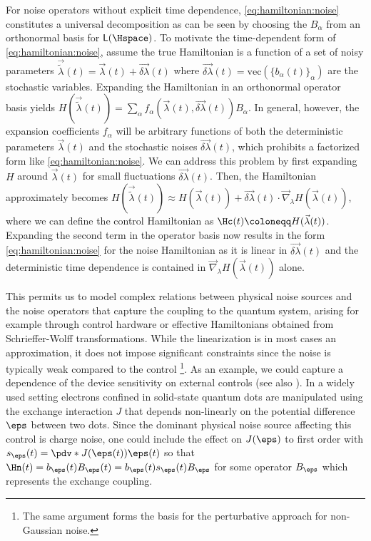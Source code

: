 For noise operators without explicit time dependence, \cref{eq:hamiltonian:noise} constitutes a universal decomposition as can be seen by choosing the $B_\alpha$ from an orthonormal basis for $\mathsf{L}(\Hspace)$. To motivate the time-dependent form of \cref{eq:hamiltonian:noise}, assume the true Hamiltonian is a function of a set of noisy parameters $\vec{\tilde{\lambda}}(t) = \vec{\lambda}(t) + \vec{\delta\lambda}(t)$ where $\vec{\delta\lambda}(t) = \text{vec}(\{b_\alpha(t)\}_\alpha)$ are the stochastic variables. Expanding the Hamiltonian in an orthonormal operator basis yields $H(\vec{\tilde{\lambda}}(t)) = \sum_\alpha f_\alpha(\vec{\lambda}(t), \vec{\delta\lambda}(t)) B_\alpha$. In general, however, the expansion coefficients $f_\alpha$ will be arbitrary functions of both the deterministic parameters $\vec{\lambda}(t)$ and the stochastic noises $\vec{\delta\lambda}(t)$, which prohibits a factorized form like \cref{eq:hamiltonian:noise}. We can address this problem by first expanding $H$ around $\vec{\lambda}(t)$ for small fluctuations $\vec{\delta\lambda}(t)$. Then, the Hamiltonian approximately becomes $H(\vec{\tilde{\lambda}}(t)) \approx H(\vec{\lambda}(t)) + \vec{\delta\lambda}(t)\cdot\vec{\nabla}_{\lambda} H(\vec{\lambda}(t))$, where we can define the control Hamiltonian as $\Hc(t)\coloneqq H(\vec{\lambda}(t))$. Expanding the second term in the operator basis now results in the form \eqref{eq:hamiltonian:noise} for the noise Hamiltonian as it is linear in $\vec{\delta\lambda}(t)$ and the deterministic time dependence is contained in $\vec{\nabla}_{\lambda} H(\vec{\lambda}(t))$ alone.

This permits us to model complex relations between physical noise sources and the noise operators that capture the coupling to the quantum system, arising for example through control hardware or effective Hamiltonians obtained from \eg Schrieffer-Wolff transformations. While the linearization is in most cases an approximation, it does not impose significant constraints since the noise is typically weak compared to the control \footnote{The same argument forms the basis for the perturbative approach for non-Gaussian noise.}. As an example, we could capture a dependence of the device sensitivity on external controls (see also ). In a widely used setting electrons confined in solid-state quantum dots are manipulated using the exchange interaction $J$ that depends non-linearly on the potential difference $\eps$ between two dots. Since the dominant physical noise source affecting this control is charge noise, one could include the effect on $J(\eps)$ to first order with $s_\eps(t)=\pdv*{J(\eps(t))}{\eps(t)}$ so that $\Hn(t) = b_\eps(t) B_\eps(t)  =  b_\eps(t) s_\eps(t) B_\eps$ for some operator $B_\eps$ which represents the exchange coupling.

